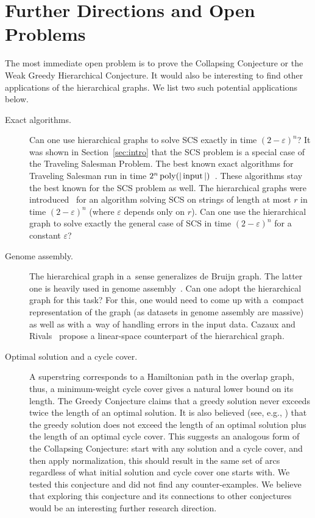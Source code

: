 \section{Further Directions and Open Problems}
The most immediate open problem is to prove the Collapsing Conjecture or the Weak Greedy Hierarchical Conjecture.
It would also be interesting to find other applications of the 
hierarchical graphs. We list two such potential applications below.
\begin{description}
\item[Exact algorithms.] Can one use hierarchical graphs to solve SCS exactly in time $(2-\varepsilon)^n$?
It was shown in Section~\ref{sec:intro} that the SCS problem is a special case of the Traveling Salesman Problem. The best known exact algorithms for Traveling Salesman run in time $2^n \operatorname{poly}(|\operatorname{input}|)$~\cite{B1962, HK1971, KGK1977, K1982, BF1996}. These algorithms stay the best known for the SCS problem as well. The hierarchical graphs were introduced~\cite{scs_exact} for an algorithm solving SCS on strings of length at most $r$ in time $(2-\varepsilon)^n$ (where $\varepsilon$ depends only on $r$). Can one use the hierarchical graph to solve exactly the general case of SCS in time $(2-\varepsilon)^n$ for a constant $\varepsilon$?

\item[Genome assembly.] The hierarchical graph in a~sense
generalizes de Bruijn graph. The latter one is heavily used
in genome assembly~\cite{pevzner2001eulerian}.
Can one adopt the hierarchical graph for this task? For this, one
would need to come up with a~compact representation of the graph
(as datasets in genome assembly are massive) as well as with a~way of
handling errors in the input data. Cazaux and Rivals~\cite{cazaux2018hierarchical} propose a linear-space counterpart of the hierarchical graph.

\item[Optimal solution and a cycle cover.] A superstring corresponds to a Hamiltonian path in the overlap graph, thus, a minimum-weight cycle cover gives a natural lower bound on its length. 
The Greedy Conjecture claims that a greedy solution never exceeds twice the length of an optimal solution. It is also  believed (see, e.g., \cite{weinard2006greedy,laube2005conditional}) that the greedy solution does not exceed the length of an optimal solution plus the length of an optimal cycle cover. This suggests an analogous form of the Collapsing Conjecture: start with any solution and a cycle cover, and then apply normalization, this should result in the same set of arcs regardless of what initial solution and cycle cover one starts with. We tested this conjecture and did not find any counter-examples. We believe that exploring this conjecture and its connections to other conjectures would be an interesting further research direction.
\end{description}
